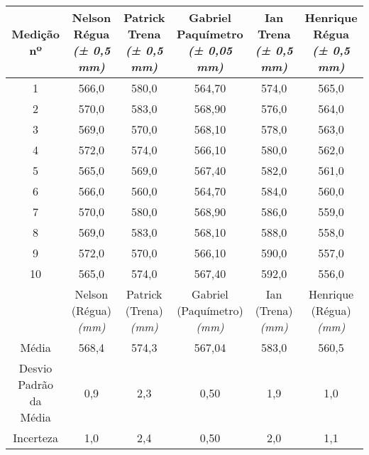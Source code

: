 \documentclass{article}
\begin{document}
\begin{table}[h!]
\centering
\begin{tabular}{c c c c c c }
\toprule
Medição nº & \shortstack{Nelson\\Régua\\\textit{(± 0,5 mm)}} & \shortstack{Patrick\\Trena\\\textit{(± 0,5 mm)}} & \shortstack{Gabriel\\Paquímetro\\\textit{(± 0,05 mm)}} & \shortstack{Ian\\Trena\\\textit{(± 0,5 mm)}} & \shortstack{Henrique\\Régua\\\textit{(± 0,5 mm)}}\\
\midrule
1 & 566,0 & 580,0 & 564,70 & 574,0 & 565,0\\
2 & 570,0 & 583,0 & 568,90 & 576,0 & 564,0\\
3 & 569,0 & 570,0 & 568,10 & 578,0 & 563,0\\
4 & 572,0 & 574,0 & 566,10 & 580,0 & 562,0\\
5 & 565,0 & 569,0 & 567,40 & 582,0 & 561,0\\
6 & 566,0 & 560,0 & 564,70 & 584,0 & 560,0\\
7 & 570,0 & 580,0 & 568,90 & 586,0 & 559,0\\
8 & 569,0 & 583,0 & 568,10 & 588,0 & 558,0\\
9 & 572,0 & 570,0 & 566,10 & 590,0 & 557,0\\
10 & 565,0 & 574,0 & 567,40 & 592,0 & 556,0\\
\midrule
&\shortstack{Nelson\\(Régua)\\\textit{(mm)}} & \shortstack{Patrick\\(Trena)\\\textit{(mm)}} & \shortstack{Gabriel\\(Paquímetro)\\\textit{(mm)}} & \shortstack{Ian\\(Trena)\\\textit{(mm)}} & \shortstack{Henrique\\(Régua)\\\textit{(mm)}}\\
\midrule
Média & 568,4 & 574,3 & 567,04 & 583,0 & 560,5\\[3pt]
\shortstack{Desvio\\Padrão da\\Média} & 0,9 & 2,3 & 0,50 & 1,9 & 1,0\\[3pt]
Incerteza & 1,0 & 2,4 & 0,50 & 2,0 & 1,1\\
\bottomrule
\end{tabular}
\end{table}
\end{document}

